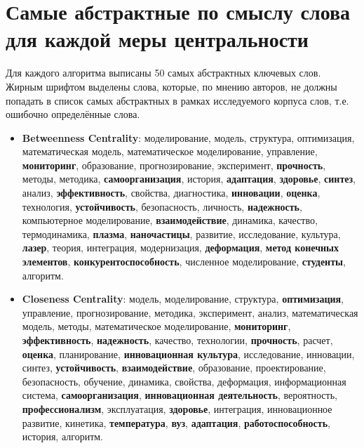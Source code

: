 \chapter{Самые абстрактные по смыслу слова для каждой меры
центральности} \label{AppendixA}
Для каждого алгоритма выписаны 50 самых абстрактных ключевых слов. Жирным шрифтом выделены слова, которые, по мнению авторов, не должны попадать в список самых абстрактных в рамках исследуемого корпуса слов, т.е. ошибочно определённые слова.
\begin{itemize}
    \item \textbf{Betweenness Centrality}: моделирование, модель, структура, оптимизация, математическая модель, математическое моделирование, управление, \textbf{мониторинг}, образование, прогнозирование, эксперимент, \textbf{прочность}, методы, методика, \textbf{самоорганизация}, история, \textbf{адаптация}, \textbf{здоровье}, \textbf{синтез}, анализ, \textbf{эффективность}, свойства, диагностика, \textbf{инновации}, \textbf{оценка}, технология, \textbf{устойчивость}, безопасность, личность, \textbf{надежность}, компьютерное моделирование, \textbf{взаимодействие}, динамика, качество, термодинамика, \textbf{плазма}, \textbf{наночастицы}, развитие, исследование, культура, \textbf{лазер}, теория, интеграция, модернизация, \textbf{деформация}, \textbf{метод конечных элементов}, \textbf{конкурентоспособность}, численное моделирование, \textbf{студенты}, алгоритм.
    \item \textbf{Closeness Centrality}: модель, моделирование, структура, \textbf{оптимизация}, управление, прогнозирование, методика, эксперимент, анализ, математическая модель, методы, математическое моделирование, \textbf{мониторинг}, \textbf{эффективность}, \textbf{надежность}, качество, технологии, \textbf{прочность}, расчет, \textbf{оценка}, планирование, \textbf{инновационная культура}, исследование, инновации, синтез, \textbf{устойчивость}, \textbf{взаимодействие}, образование, проектирование, безопасность, обучение, динамика, свойства, деформация, информационная система, \textbf{самоорганизация}, \textbf{инновационная деятельность}, вероятность, \textbf{профессионализм}, эксплуатация, \textbf{здоровье}, интеграция, инновационное развитие, кинетика, \textbf{температура}, \textbf{вуз}, \textbf{адаптация}, \textbf{работоспособность}, история, алгоритм.

\end{itemize}
